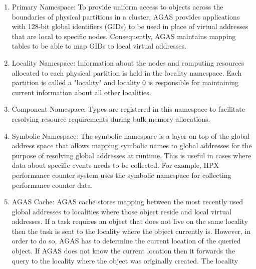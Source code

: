 
\begin{enumerate}
    \item{Primary Namespace:
        To provide uniform access to objects across the boundaries
        of physical partitions in a cluster, AGAS provides applications
        with 128-bit global identifiers (GIDs) to be used in place of
        virtual addresses that are local to specific nodes.
        Consequently, AGAS maintains mapping tables to be able to map GIDs
        to local virtual addresses.}
    \item{Locality Namespace:
        Information about the nodes and computing resources allocated to
        each physical partition is held in the locality namespace. Each 
        partition is called a "locality" and locality 0 is responsible for 
        maintaining current information about all other localities.}
    \item{Component Namespace:
        Types are registered in this namespace to facilitate resolving resource 
        requirements during bulk memory allocations.}
    \item{Symbolic Namespace:
		The symbolic namespace is a layer on top of the global address space
		that allows mapping symbolic names to global addresses for the purpose
		of resolving global addresses at runtime. This is useful in cases where
		data about specific events needs to be collected. For example, HPX
		performance counter system uses the symbolic namespace for collecting
		performance counter data.}
    \item{AGAS Cache:
		AGAS cache stores mapping between the most recently used global
		addresses to localities where those object reside and local virtual addresses. If a task requires
		an object that does not live on the same locality then the task is sent
		to the locality where the object currently is. However, in order to do
		so, AGAS has to determine the current location of the queried object.
		If AGAS does not know the current location then it forwards the query
		to the locality where the object was originally created. The locality
}
\end{enumerate}
